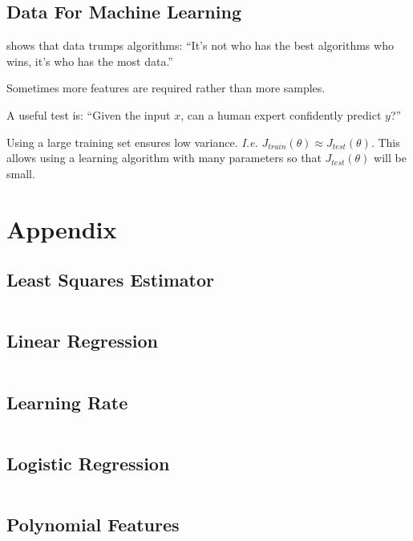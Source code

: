 \documentclass[a4paper,twoside,10pt]{article}
\begin{document}
\subsection{Data For Machine Learning}
\citep{banko2001scaling} shows that data trumps algorithms:
``It’s not who has the best algorithms who wins, it’s who has the most data.''

Sometimes more features are required rather than more samples.

A useful test is: ``Given the input $x$, can a human expert confidently predict $y$?''

Using a large training set ensures low variance. \emph{I.e.} $J_{train}(\theta)\approx J_{test}(\theta)$.
This allows using a learning algorithm with many parameters so that $J_{test}(\theta)$ will be small.


\clearpage

\appendix
\section{Appendix}
\subsection{Least Squares Estimator}\label{app:lse}
\inputminted[frame=lines,linenos,fontsize=\small]{python}{least_squares.py}

\subsection{Linear Regression}\label{app:gradientdescent}
\inputminted[frame=lines,linenos,fontsize=\small]{python}{gradient_descent.py}

\subsection{Learning Rate}\label{app:alphas}
\inputminted[frame=lines,linenos,fontsize=\small]{python}{learning_rate.py}

\subsection{Logistic Regression}\label{app:classifier}
\inputminted[frame=lines,linenos,fontsize=\small]{python}{classifier.py}

\subsection{Polynomial Features}\label{app:polynomial}
\inputminted[frame=lines,linenos,fontsize=\small]{python}{polynomial.py}
\end{document}

